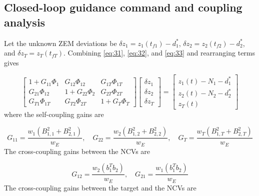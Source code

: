 \subsection{Closed-loop guidance command and coupling analysis}
Let the unknown ZEM deviations be ${\delta z_1} = {z_1}({t_{f1}}) - d_1^*$, ${\delta z_2} = {z_2}({t_{f2}}) - d_2^*$, and ${\delta z_T} = {z_T}({t_{fT}})$. Combining \eqref{eq:31}, \eqref{eq:32}, and \eqref{eq:33} and rearranging terms gives

\begin{equation}
\label{eq:38}
\left[ {\begin{array}{*{20}{c}}
  {1 + {G_{11}}{\Phi _1}}&{{G_{12}}{\Phi _{12}}}&{{G_{1T}}{\Phi _{1T}}} \\ 
  {{G_{21}}{\Phi _{12}}}&{1 + {G_{22}}{\Phi _2}}&{{G_{2T}}{\Phi _{2T}}} \\ 
  {{G_{T1}}{\Phi _{1T}}}&{{G_{T2}}{\Phi _{2T}}}&{1 + {G_T}{\Phi _T}} 
\end{array}} \right]
\begin{bmatrix}
  {\delta z_1} \\
  {\delta z_2} \\
  {\delta z_T}
\end{bmatrix}
=
\begin{bmatrix}
  {z_1}(t) - {N_1} - d_1^* \\
  {z_2}(t) - {N_2} - d_2^* \\
  {z_T}(t)
\end{bmatrix}
\end{equation}
where the self-coupling gains are

\begin{equation}
\label{eq:39}
{G_{11}} = \frac{{{w_1}(B_{1,1}^2 + B_{2,1}^2)}}{{{w_E}}},\quad {G_{22}} = \frac{{{w_2}(B_{1,2}^2 + B_{2,2}^2)}}{{{w_E}}},\quad {G_T} = \frac{{{w_T}(B_{1,T}^2 + B_{2,T}^2)}}{{{w_E}}}
\end{equation}
The cross-coupling gains between the NCVs are

\begin{equation}
\label{eq:40}
{G_{12}} = \frac{{{w_2}(b_1^T{b_2})}}{{{w_E}}},\quad {G_{21}} = \frac{{{w_1}(b_1^T{b_2})}}{{{w_E}}}
\end{equation}
The cross-coupling gains between the target and the NCVs are

